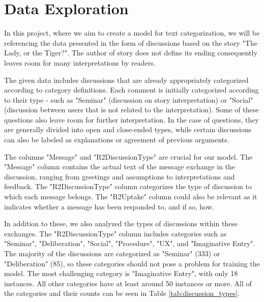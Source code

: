 \documentclass[fleqn,moreauthors,10pt]{ds_report}
\begin{document}

\section*{Data Exploration}

In this project, where we aim to create a model for text categorization, we will be referencing the data presented in the form of discussions based on the story "The Lady, or the Tiger?". The author of story does not define its ending consequently leaves room for many interpretations by readers.

The given data includes discussions that are already appropriately categorized according to category definitions. Each comment is initially categorized according to their type - such as "Seminar" (discussion on story interpretation) or "Social" (discussion between users that is not related to the interpretation). Some of these questions also leave room for further interpretation. In the case of questions, they are generally divided into open and close-ended types, while certain discussions can also be labeled as explanations or agreement of previous arguments.

The columns "Message" and "R2DiscussionType" are crucial for our model. The "Message" column contains the actual text of the message exchange in the discussion, ranging from greetings and assumptions to interpretations and feedback. The "R2DiscussionType" column categorizes the type of discussion to which each message belongs. The "R2Uptake" column could also be relevant as it indicates whether a message has been responded to, and if so, how.

In addition to these, we also analyzed the types of discussions within these exchanges. The "R2DiscussionType" column includes categories such as "Seminar", "Deliberation", "Social", "Procedure", "UX", and "Imaginative Entry". The majority of the discussions are categorized as "Seminar" (333) or "Deliberation" (85), so these categories should not pose a problem for training the model. The most challenging category is "Imaginative Entry", with only 18 instances. All other categories have at least around 50 instances or more. All of the categories and their counts can be seen in Table \ref{tab:discussion_types}.
\end{document}
